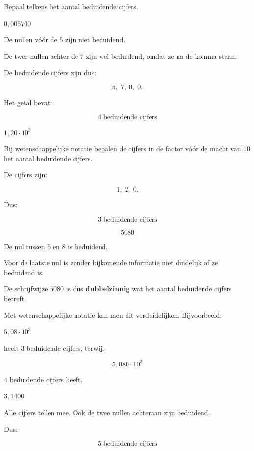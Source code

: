 \documentclass{ximera}
\begin{document}
\begin{oefening}{\oefB\ESS}

Bepaal telkens het aantal beduidende cijfers.

\begin{question}
\(
0{,}005700
\)

\begin{oplossing}
De nullen vóór de $5$ zijn niet beduidend.

De twee nullen achter de $7$ zijn wel beduidend, omdat ze na de komma staan.

De beduidende cijfers zijn dus:

\[
5,\;7,\;0,\;0.
\]

Het getal bevat:

\[
\boxed{4\text{ beduidende cijfers}}
\]
\end{oplossing}
\end{question}


\begin{question}
\(
1{,}20 \cdot 10^3
\)

\begin{oplossing}
Bij wetenschappelijke notatie bepalen de cijfers in de factor vóór de macht
van $10$ het aantal beduidende cijfers.

De cijfers zijn:

\[
1,\;2,\;0.
\]

Dus:

\[
\boxed{3\text{ beduidende cijfers}}
\]
\end{oplossing}
\end{question}


\begin{question}
\[
5080
\]

\begin{oplossing}
De nul tussen $5$ en $8$ is beduidend.

Voor de laatste nul is zonder bijkomende informatie niet duidelijk of ze
beduidend is.

De schrijfwijze $5080$ is dus \textbf{dubbelzinnig} wat het aantal
beduidende cijfers betreft.

Met wetenschappelijke notatie kan men dit verduidelijken. Bijvoorbeeld:

\(
5{,}08\cdot10^3
\)

heeft $3$ beduidende cijfers, terwijl

\[
5{,}080\cdot10^3
\]

$4$ beduidende cijfers heeft.
\end{oplossing}
\end{question}


\begin{question}
\(
3{,}1400
\)

\begin{oplossing}
Alle cijfers tellen mee. Ook de twee nullen achteraan zijn beduidend.

Dus:

\[
\boxed{5\text{ beduidende cijfers}}
\]
\end{oplossing}
\end{question}

\end{oefening}
\end{document}
